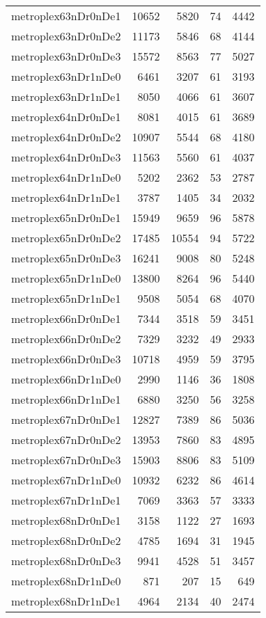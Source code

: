 \begin{longtable}{lrrrr}
metroplex63nDr0nDe1 & 10652 & 5820 & 74 & 4442 \\
metroplex63nDr0nDe2 & 11173 & 5846 & 68 & 4144 \\
metroplex63nDr0nDe3 & 15572 & 8563 & 77 & 5027 \\
metroplex63nDr1nDe0 & 6461 & 3207 & 61 & 3193 \\
metroplex63nDr1nDe1 & 8050 & 4066 & 61 & 3607 \\
metroplex64nDr0nDe1 & 8081 & 4015 & 61 & 3689 \\
metroplex64nDr0nDe2 & 10907 & 5544 & 68 & 4180 \\
metroplex64nDr0nDe3 & 11563 & 5560 & 61 & 4037 \\
metroplex64nDr1nDe0 & 5202 & 2362 & 53 & 2787 \\
metroplex64nDr1nDe1 & 3787 & 1405 & 34 & 2032 \\
metroplex65nDr0nDe1 & 15949 & 9659 & 96 & 5878 \\
metroplex65nDr0nDe2 & 17485 & 10554 & 94 & 5722 \\
metroplex65nDr0nDe3 & 16241 & 9008 & 80 & 5248 \\
metroplex65nDr1nDe0 & 13800 & 8264 & 96 & 5440 \\
metroplex65nDr1nDe1 & 9508 & 5054 & 68 & 4070 \\
metroplex66nDr0nDe1 & 7344 & 3518 & 59 & 3451 \\
metroplex66nDr0nDe2 & 7329 & 3232 & 49 & 2933 \\
metroplex66nDr0nDe3 & 10718 & 4959 & 59 & 3795 \\
metroplex66nDr1nDe0 & 2990 & 1146 & 36 & 1808 \\
metroplex66nDr1nDe1 & 6880 & 3250 & 56 & 3258 \\
metroplex67nDr0nDe1 & 12827 & 7389 & 86 & 5036 \\
metroplex67nDr0nDe2 & 13953 & 7860 & 83 & 4895 \\
metroplex67nDr0nDe3 & 15903 & 8806 & 83 & 5109 \\
metroplex67nDr1nDe0 & 10932 & 6232 & 86 & 4614 \\
metroplex67nDr1nDe1 & 7069 & 3363 & 57 & 3333 \\
metroplex68nDr0nDe1 & 3158 & 1122 & 27 & 1693 \\
metroplex68nDr0nDe2 & 4785 & 1694 & 31 & 1945 \\
metroplex68nDr0nDe3 & 9941 & 4528 & 51 & 3457 \\
metroplex68nDr1nDe0 & 871 & 207 & 15 & 649 \\
metroplex68nDr1nDe1 & 4964 & 2134 & 40 & 2474 \\

\end{longtable}

